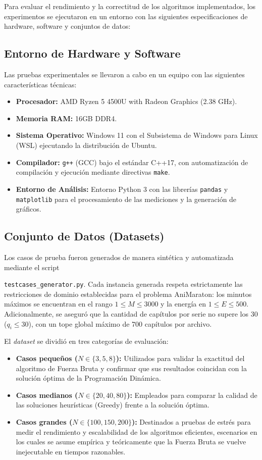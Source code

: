Para evaluar el rendimiento y la correctitud de los algoritmos implementados, los experimentos se ejecutaron en un entorno con las siguientes especificaciones de hardware, software y conjuntos de datos:

\subsection{Entorno de Hardware y Software}
Las pruebas experimentales se llevaron a cabo en un equipo con las siguientes características técnicas:
\begin{itemize}
    \item \textbf{Procesador:} AMD Ryzen 5 4500U with Radeon Graphics (2.38 GHz).
    \item \textbf{Memoria RAM:} 16GB DDR4.
    \item \textbf{Sistema Operativo:} Windows 11 con el Subsistema de Windows para Linux (WSL) ejecutando la distribución de Ubuntu.
    \item \textbf{Compilador:} \texttt{g++} (GCC) bajo el estándar C++17, con automatización de compilación y ejecución mediante directivas \texttt{make}.
    \item \textbf{Entorno de Análisis:} Entorno Python 3 con las librerías \texttt{pandas} y \texttt{matplotlib} para el procesamiento de las mediciones y la generación de gráficos.
\end{itemize}

\subsection{Conjunto de Datos (Datasets)}
Los casos de prueba fueron generados de manera sintética y automatizada mediante el script 

\texttt{testcases\_generator.py}. Cada instancia generada respeta estrictamente las restricciones de dominio establecidas para el problema AniMaraton: los minutos máximos se encuentran en el rango $1 \le M \le 3000$ y la energía en $1 \le E \le 500$. Adicionalmente, se aseguró que la cantidad de capítulos por serie no supere los 30 ($q_i \le 30$), con un tope global máximo de 700 capítulos por archivo.

El \textit{dataset} se dividió en tres categorías de evaluación:
\begin{itemize}
    \item \textbf{Casos pequeños ($N \in \{3, 5, 8\}$):} Utilizados para validar la exactitud del algoritmo de Fuerza Bruta y confirmar que sus resultados coincidan con la solución óptima de la Programación Dinámica.
    \item \textbf{Casos medianos ($N \in \{20, 40, 80\}$):} Empleados para comparar la calidad de las soluciones heurísticas (Greedy) frente a la solución óptima.
    \item \textbf{Casos grandes ($N \in \{100, 150, 200\}$):} Destinados a pruebas de estrés para medir el rendimiento y escalabilidad de los algoritmos eficientes, escenarios en los cuales se asume empírica y teóricamente que la Fuerza Bruta se vuelve inejecutable en tiempos razonables.
\end{itemize}

